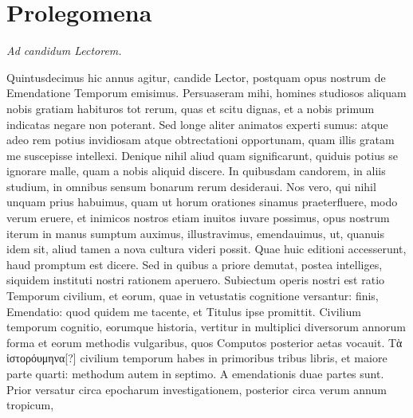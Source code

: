

\chapter{Prolegomena}
\begin{center}
\em{Ad candidum Lectorem.}
\end{center}
%
Quintusdecimus hic annus agitur, candide
Lector, postquam opus nostrum de
Emendatione Temporum emisimus.
Persuaseram
mihi, homines studiosos aliquam nobis
gratiam habituros tot rerum, quas et scitu
dignas, et a nobis primum indicatas negare
non poterant.
Sed longe aliter animatos experti
sumus: atque adeo rem potius invidiosam
atque obtrectationi opportunam, quam illis gratam me suscepisse
intellexi.
Denique nihil aliud quam significarunt, quiduis potius
se ignorare malle, quam a nobis aliquid discere.
In quibusdam
candorem, in aliis studium, in omnibus sensum bonarum rerum desideraui.
Nos vero, qui nihil unquam prius habuimus, quam ut horum
orationes sinamus praeterfluere, modo verum eruere, et inimicos
nostros etiam inuitos iuvare possimus, opus nostrum iterum in
manus sumptum auximus, illustravimus, emendauimus, ut, quanuis
idem sit, aliud tamen a nova cultura videri possit.
Quae huic editioni
accesserunt, haud promptum est dicere.
Sed in quibus a priore demutat,
postea intelliges, siquidem instituti nostri rationem aperuero.
Subiectum operis nostri est ratio Temporum civilium, et eorum,
quae in vetustatis cognitione versantur: finis, Emendatio: quod quidem
me tacente, et Titulus ipse promittit.
Civilium temporum cognitio,
eorumque historia, vertitur in multiplici diversorum annorum
forma et eorum methodis vulgaribus, quos Computos posterior
aetas vocauit.
\textgreek{Τὰ ἱστορόυμηνα[?]} civilium temporum habes in primoribus
tribus libris, et maiore parte quarti: methodum autem in septimo.
A emendationis duae partes sunt.
Prior versatur circa epocharum
investigationem, posterior circa verum annum tropicum, 
